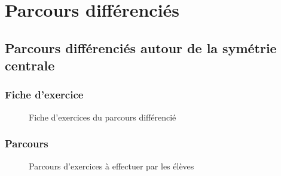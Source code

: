 \section{Parcours différenciés}
\subsection{Parcours différenciés autour de la symétrie centrale}
\subsubsection*{Fiche d'exercice}\label{parcours_symetrie_centrale}
\begin{figure}[!h]
	\caption{Fiche d'exercices du parcours différencié}
\end{figure}
\subsubsection*{Parcours}
\begin{figure}[!h]
	\caption{Parcours d'exercices à effectuer par les élèves}
\end{figure}

\clearpage

